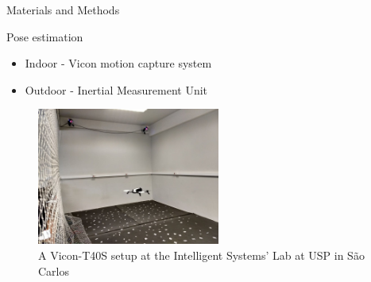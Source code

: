 \begin{frame}{Materials and Methods}
\begin{block}{Pose estimation}
	\begin{itemize}
		\item Indoor - Vicon motion capture system
		\item Outdoor - Inertial Measurement Unit
	\end{itemize}

\begin{figure}
	\centering
	\includegraphics[clip,trim=0 0cm 0cm 0,width=6cm]{img/viconRoom.jpeg}
	\caption{A Vicon-T40S setup at the Intelligent Systems' Lab at USP in São Carlos}	\label{fig:camera_pos}
\end{figure}
\end{block}
\end{frame}


